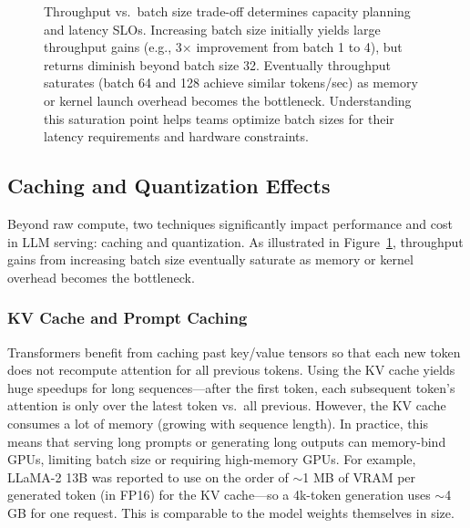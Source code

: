 \begin{figure}[t]
\begin{llmfigbox}
  \end{llmfigbox}
  \caption{Throughput vs.\ batch size trade-off determines capacity planning and latency SLOs. Increasing batch size initially yields large throughput gains (e.g., 3$\times$ improvement from batch 1 to 4), but returns diminish beyond batch size 32. Eventually throughput saturates (batch 64 and 128 achieve similar tokens/sec) as memory or kernel launch overhead becomes the bottleneck. Understanding this saturation point helps teams optimize batch sizes for their latency requirements and hardware constraints.}
  \label{fig:ch03_batchtradeoff}
\end{figure}

\subsection{Caching and Quantization Effects}
\label{sec:infra-cost-quant}

Beyond raw compute, two techniques significantly impact performance and cost in LLM serving: caching and quantization. As illustrated in Figure~\ref{fig:ch03_batchtradeoff}, throughput gains from increasing batch size eventually saturate as memory or kernel overhead becomes the bottleneck.

\subsubsection{KV Cache and Prompt Caching} 
Transformers benefit from caching past key/value tensors so that each new token does not recompute attention for all previous tokens. Using the KV cache yields huge speedups for long sequences---after the first token, each subsequent token’s attention is only over the latest token vs.\ all previous. However, the KV cache consumes a lot of memory (growing with sequence length). In practice, this means that serving long prompts or generating long outputs can memory-bind GPUs, limiting batch size or requiring high-memory GPUs. For example, LLaMA-2 13B was reported to use on the order of $\sim$1 MB of VRAM per generated token (in FP16) for the KV cache---so a 4k-token generation uses $\sim$4 GB for one request. This is comparable to the model weights themselves in size.

